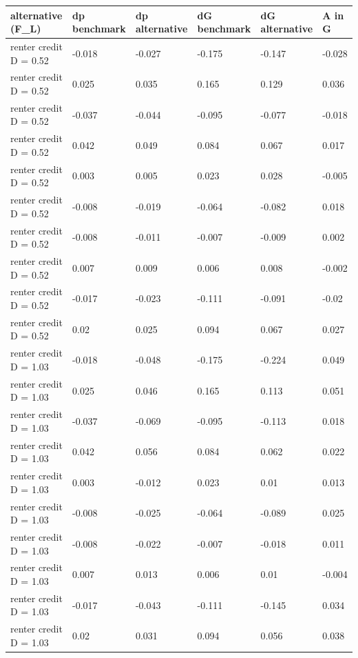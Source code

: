 \begingroup\small
\setlength{\tabcolsep}{3pt}
\renewcommand{\arraystretch}{1.04}
\begin{tabularx}{\linewidth}{XXXXXX}
\toprule
alternative (F\_L) & dp benchmark & dp alternative & dG benchmark & dG alternative & A in G \\
\midrule
renter credit D = 0.52 & -0.018 & -0.027 & -0.175 & -0.147 & -0.028 \\
renter credit D = 0.52 & 0.025 & 0.035 & 0.165 & 0.129 & 0.036 \\
renter credit D = 0.52 & -0.037 & -0.044 & -0.095 & -0.077 & -0.018 \\
renter credit D = 0.52 & 0.042 & 0.049 & 0.084 & 0.067 & 0.017 \\
renter credit D = 0.52 & 0.003 & 0.005 & 0.023 & 0.028 & -0.005 \\
renter credit D = 0.52 & -0.008 & -0.019 & -0.064 & -0.082 & 0.018 \\
renter credit D = 0.52 & -0.008 & -0.011 & -0.007 & -0.009 & 0.002 \\
renter credit D = 0.52 & 0.007 & 0.009 & 0.006 & 0.008 & -0.002 \\
renter credit D = 0.52 & -0.017 & -0.023 & -0.111 & -0.091 & -0.02 \\
renter credit D = 0.52 & 0.02 & 0.025 & 0.094 & 0.067 & 0.027 \\
renter credit D = 1.03 & -0.018 & -0.048 & -0.175 & -0.224 & 0.049 \\
renter credit D = 1.03 & 0.025 & 0.046 & 0.165 & 0.113 & 0.051 \\
renter credit D = 1.03 & -0.037 & -0.069 & -0.095 & -0.113 & 0.018 \\
renter credit D = 1.03 & 0.042 & 0.056 & 0.084 & 0.062 & 0.022 \\
renter credit D = 1.03 & 0.003 & -0.012 & 0.023 & 0.01 & 0.013 \\
renter credit D = 1.03 & -0.008 & -0.025 & -0.064 & -0.089 & 0.025 \\
renter credit D = 1.03 & -0.008 & -0.022 & -0.007 & -0.018 & 0.011 \\
renter credit D = 1.03 & 0.007 & 0.013 & 0.006 & 0.01 & -0.004 \\
renter credit D = 1.03 & -0.017 & -0.043 & -0.111 & -0.145 & 0.034 \\
renter credit D = 1.03 & 0.02 & 0.031 & 0.094 & 0.056 & 0.038 \\
\bottomrule
\end{tabularx}
\endgroup

